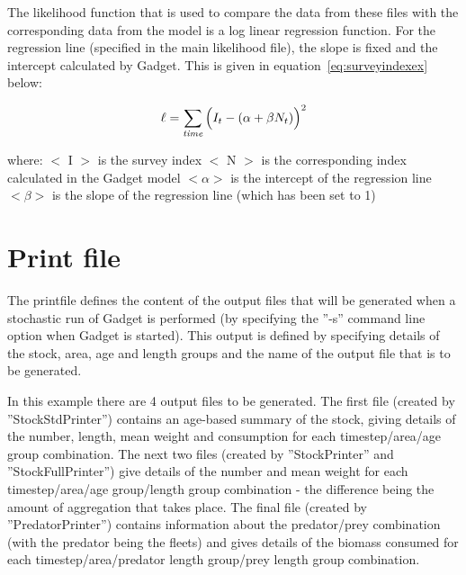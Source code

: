\documentclass[10pt,titlepage]{article}
\begin{document}
\bigskip
The likelihood function that is used to compare the data from these files with the corresponding data from the model is a log linear regression function.  For the regression line (specified in the main likelihood file), the slope is fixed and the intercept calculated by Gadget.  This is given in equation~\ref{eq:surveyindexex} below:

\begin{equation}\label{eq:surveyindexex}
\ell = \sum_{\it time}\Big(I_{t} - (\alpha + \beta N_{t})\Big)^2
\end{equation}

where:\newline
$<$ I $>$ is the survey index\newline
$<$ N $>$ is the corresponding index calculated in the Gadget model\newline
$<\alpha>$ is the intercept of the regression line\newline
$<\beta>$ is the slope of the regression line (which has been set to 1)

{\small }

\section{Print file}
The printfile defines the content of the output files that will be generated when a stochastic run of Gadget is performed (by specifying the ''-s'' command line option when Gadget is started).  This output is defined by specifying details of the stock, area, age and length groups and the name of the output file that is to be generated.

\bigskip
In this example there are 4 output files to be generated.  The first file (created by ''StockStdPrinter'') contains an age-based summary of the stock, giving details of the number, length, mean weight and consumption for each timestep/area/age group combination.  The next two files (created by ''StockPrinter'' and ''StockFullPrinter'') give details of the number and mean weight for each timestep/area/age group/length group combination - the difference being the amount of aggregation that takes place.  The final file (created by ''PredatorPrinter'') contains information about the predator/prey combination (with the predator being the fleets) and gives details of the biomass consumed for each timestep/area/predator length group/prey length group combination.

{\small }
\end{document}

